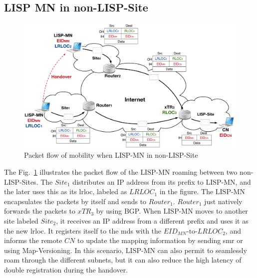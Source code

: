 \subsection{LISP MN in non-LISP-Site}
\label{subsec:lispMN_NLS}

\begin{figure}[!t]
	\centering
	\includegraphics[width=\textwidth]{Pics/LISP-MN_in_non-LISP-Site.eps}
	\caption{Packet flow of mobility when LISP-MN in non-LISP-Site}
	\label{LISP-MN_in_non-LISP-Site}
\end{figure}
The Fig.~\ref{LISP-MN_in_non-LISP-Site} illustrates the packet flow of the $\text{LISP-MN}$ roaming between two non-LISP-Sites. The $Site_1$ distributes an IP address from its prefix to $\text{LISP-MN}$, and the later uses this as its \acrshort{lrloc}, labeled as $LRLOC_1$ in the figure. The $\text{LISP-MN}$ encapsulates the packets by itself and sends to $Router_1$. $Router_1$ just natively forwards the packets to $xTR_3$ by using BGP. When $\text{LISP-MN}$ moves to another site labeled $Site_2$, it receives an IP address from a different prefix and uses it as the new \acrshort{lrloc}. It registers itself to the \acrshort{mds} with the $EID_{MN}\text{-to-}LRLOC_2$, and informs the remote $CN$ to update the mapping information by sending \acrshort{smr} or using Map-Versioning. In this scenario, $\text{LISP-MN}$ can also permit to seamlessly roam through the different subnets, but it can also reduce the high latency of double registration during the handover. 



